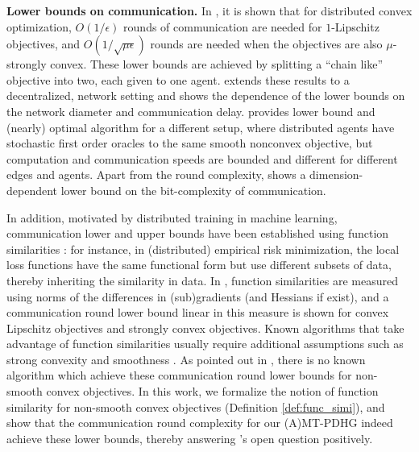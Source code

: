 \documentclass[10pt]{article}
\begin{document}
\textbf{Lower bounds on communication.} In \cite{ArjevaniShamir2015Communication}, it is shown that for distributed convex optimization, $O(1/\epsilon)$ rounds of communication are needed for $1$-Lipschitz objectives, and $O(1/\sqrt{\mu\epsilon})$ rounds are needed when the objectives are also $\mu$-strongly convex. These lower bounds are achieved by splitting a ``chain like'' objective into two, each given to one agent. \cite{Scaman2019} extends these results to a decentralized, network setting and shows the dependence of the lower bounds on the network diameter and communication delay. \cite{Tyurin2024} provides lower bound and (nearly) optimal algorithm for a different setup, where distributed agents have stochastic first order oracles to the same smooth nonconvex objective, but computation and communication speeds are bounded and different for different edges and agents. Apart from the round complexity, \cite{Santosh2020} shows a dimension-dependent lower bound on the bit-complexity of communication.  

In addition, motivated by distributed training in machine learning, communication lower and upper bounds have been established using function similarities \cite{ArjevaniShamir2015Communication,pmlr-v32-shamir14,Zhu2016,pmlr-v151-tian22b,Kovalev2022,pmlr-v119-karimireddy20a,pmlr-v119-koloskova20a}: for instance, in (distributed) empirical risk minimization, the local loss functions have the same functional form but use different subsets of data, thereby inheriting the similarity in data. In \cite{ArjevaniShamir2015Communication}, function similarities are measured using norms of the differences in (sub)gradients (and Hessians if exist), and a communication round lower bound linear in this measure is shown for convex Lipschitz objectives and strongly convex objectives. Known algorithms that take advantage of function similarities usually require additional assumptions such as strong convexity and smoothness \cite{Zhu2016,pmlr-v32-shamir14,pmlr-v37-zhangb15,pmlr-v151-tian22b,Kovalev2022,pmlr-v119-karimireddy20a,pmlr-v119-koloskova20a}. As pointed out in \cite{ArjevaniShamir2015Communication}, there is no known algorithm which achieve these communication round lower bounds for non-smooth convex objectives. In this work, we formalize the notion of function similarity for non-smooth convex objectives (Definition \ref{def:func_simi}), and show that the communication round complexity for our (A)MT-PDHG indeed achieve these lower bounds, thereby answering \cite{ArjevaniShamir2015Communication}'s open question positively. 
\end{document}
